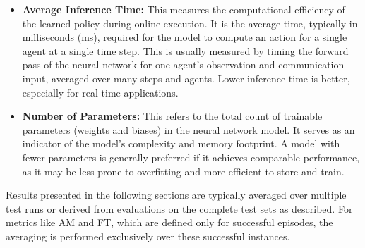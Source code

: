 \begin{itemize}
    \item \textbf{Average Inference Time:} This measures the computational efficiency of the learned policy during online execution. It is the average time, typically in milliseconds (ms), required for the model to compute an action for a single agent at a single time step. This is usually measured by timing the forward pass of the neural network for one agent's observation and communication input, averaged over many steps and agents. Lower inference time is better, especially for real-time applications.

    \item \textbf{Number of Parameters:} This refers to the total count of trainable parameters (weights and biases) in the neural network model. It serves as an indicator of the model's complexity and memory footprint. A model with fewer parameters is generally preferred if it achieves comparable performance, as it may be less prone to overfitting and more efficient to store and train.
\end{itemize}
Results presented in the following sections are typically averaged over multiple test runs or derived from evaluations on the complete test sets as described. For metrics like AM and FT, which are defined only for successful episodes, the averaging is performed exclusively over these successful instances.

